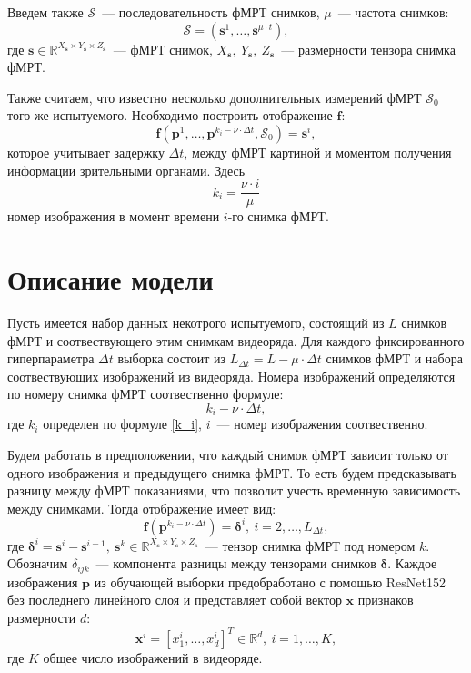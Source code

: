 \documentclass[12pt,twoside]{article}
\begin{document}
Введем также $\mathcal{S}$~--- последовательность фМРТ снимков,  $\mu$~--- частота снимков:
\begin{equation}
    \mathcal{S} = (\bm{s}^{1}, \dots, \bm{s}^{\mu \cdot t}),
\end{equation}
где $\bm{s} \in \mathbb{R}^{X_{\bm{s}} \times Y_{\bm{s}} \times Z_{\bm{s}}}$~--- фМРТ снимок, $X_{\bm{s}},~Y_{\bm{s}},~Z_{\bm{s}}$~--- размерности тензора снимка фМРТ.


Также считаем, что известно несколько дополнительных измерений фМРТ $\mathcal{S}_0$ того же испытуемого.
Необходимо построить отображение $\bm{f}$:
\begin{equation}
    \bm{f}(\bm{p}^{1}, \dots, \bm{p}^{k_i - \nu \cdot \Delta t}, \mathcal{S}_0) = \bm{s}^i,
\end{equation}
которое учитывает задержку $\Delta t$, между фМРТ картиной и моментом получения информации зрительными органами.
Здесь
\begin{equation}
    \label{k_i}
    k_i = \dfrac{\nu \cdot i}{\mu}
\end{equation}
номер изображения в момент времени $i$-го снимка фМРТ.

\section{Описание модели}
Пусть имеется набор данных некотрого испытуемого, состоящий из $L$ снимков фМРТ и соотвествующего этим снимкам видеоряда.
Для каждого фиксированного гиперпараметра $\Delta t$ выборка состоит из $L_{\Delta t} = L - \mu \cdot \Delta t$  снимков фМРТ и набора соотвествующих изображений из видеоряда. 
Номера изображений определяются по номеру снимка фМРТ соотвественно формуле:
\begin{equation}
    k_i - \nu \cdot \Delta t,
\end{equation}
где $k_i$ определен по формуле \eqref{k_i}, $i$~--- номер изображения соотвественно.

Будем работать в предположении, что каждый снимок фМРТ зависит только от одного изображения и предыдущего снимка фМРТ. 
То есть будем предсказывать разницу между фМРТ показаниями, что позволит учесть временную зависимость между снимками.
Тогда отображение имеет вид:
\begin{equation}
	\label{main_model}
	\bm{f}(\bm{p}^{k_i - \nu \cdot \Delta t}) = \bm{\delta}^i, \ i = 2, \ldots, L_{\Delta t},
\end{equation}
где $\bm{\delta}^i = \bm{s}^i - \bm{s}^{i-1},~\bm{s}^k \in \mathbb{R}^{X_{\bm{s}} \times Y_{\bm{s}} \times Z_{\bm{s}}}$~--- тензор снимка фМРТ под номером $k$.
Обозначим $\delta_{ijk}$~--- компонента разницы между тензорами снимков $\bm{\delta}$.
Каждое изображения $\bm{p}$ из обучающей выборки предобработано с помощью ResNet152 без последнего линейного слоя и представляет собой вектор $\bm{x}$ признаков размерности $d$:
\[ \bm{x}^i = [x^i_1, \ldots, x^i_{d}]^{T} \in \mathbb{R}^{d}, \ i = 1, \ldots, K, \]
где $K$ общее число изображений в видеоряде.
\end{document}
